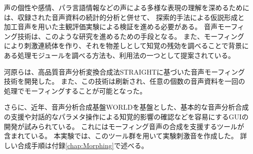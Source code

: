 声の個性や感情、パラ言語情報などの声による多様な表現の理解を深めるためには、収録された音声資料の続計的分析と併せて、
探索的手法による仮説形成と加工音声を用いた主観評価実験による検証を進める必要がある。
音声モーフィング技術は、このような研究を進めるための手段となる。
また、モーフィングにより刺激連続体を作り、それを物差しとして知覚の残効を調べることで背景にある処理モジュールを調べる方法も、利用法の一つとして提案されている。

河原らは、高品質音声分析変換合成法STRAIGHT\cite{kawahara1999restructuring}に基づいた音声モーフィング技術を開発した\cite{matsui2003STRAIGHT}。
また、この技術は刷新され、任意の個数の音声資料を一回の処理でモーフィングすることが可能となった\cite{kawahara2013morph,kawahara2014morph}。

さらに、近年、音声分析合成基盤WORLD\cite{morise2016world}を基盤とした、基本的な音声分析合成の支援や対話的なパラメタ操作による知覚的影響の確認などを容易にするGUIの開発が試みられている\cite{kawahara2024interactive}。
これにはモーフィング音声の合成を支援するツールが含まれている。
本実験では、このツール群を用いて実験刺激音を作成した。
詳しい合成手順は付録\ref{chap:Morphing}で述べる。





